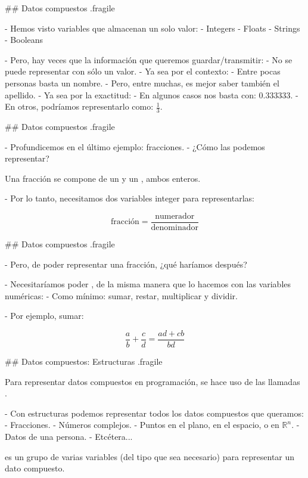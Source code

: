 ## Datos compuestos {.fragile}

- Hemos visto variables que almacenan un solo valor:
    - Integers
    - Floats
    - Strings
    - Booleans

\pause

- Pero, hay veces que la información que queremos guardar/transmitir:
    - No se puede representar con sólo un valor.
    - Ya sea por el contexto:
        - Entre pocas personas basta un nombre.
        - Pero, entre muchas, es mejor saber también el apellido.
    - Ya sea por la exactitud:
        - En algunos casos nos basta con: $0.333333$.
        - En otros, podríamos representarlo como: $\frac{1}{3}$.

## Datos compuestos {.fragile}

- Profundicemos en el último ejemplo: fracciones.
    - ¿Cómo las podemos representar?

\bgnblockidea
Una fracción se compone de un  y un , ambos enteros.
\trmblockidea

\vfill

- Por lo tanto, necesitamos dos variables integer para representarlas:

$$ \text{fracción} = \frac{\text{numerador}}{\text{denominador}} $$

## Datos compuestos {.fragile}

- Pero, de poder representar una fracción, ¿qué haríamos después?

\pause

- Necesitaríamos poder , de la misma manera que
        lo hacemos con las variables numéricas:
    - Como mínimo: sumar, restar, multiplicar y dividir.

\pause

- Por ejemplo, sumar:

$$ \frac{a}{b} + \frac{c}{d} = \frac{ad + cb}{bd}$$

## Datos compuestos: Estructuras {.fragile}

\bgnblockidea
Para representar datos compuestos en programación, se hace uso de las llamadas .
\trmblockidea

- Con estructuras podemos representar todos los datos compuestos que queramos:
    - Fracciones.
    - Números complejos.
    - Puntos en el plano, en el espacio, o en $\mathbb{R}^n$.
    - Datos de una persona.
    - Etcétera...

\bgnblockdefinition
{} es un grupo de varias variables (del tipo que sea necesario) para representar
un dato compuesto.
\trmblockdefinition

